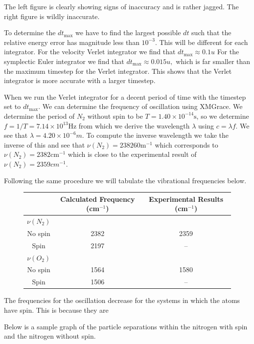 \documentclass[12pt]{article}
\begin{document}
	The left figure is clearly showing signs of inaccuracy and is rather jagged. The right figure is wildly inaccurate.
	
	To determine the $dt_{\text{max}}$ we have to find the largest possible $dt$ such that the relative energy error has magnitude less than $10^{-3}$. This will be different for each integrator. For the velocity Verlet integrator we find that $dt_{\text{max}} \approx 0.1u $ For the symplectic Euler integrator we find that $dt_{\text{max}} \approx 0.015u,$ which is far smaller than the maximum timestep for the Verlet integrator. This shows that the Verlet integrator is more accurate with a larger timestep. 
	
When we run the Verlet integrator for a decent period of time with the timestep set to $dt_{\text{max}}$. We can determine the frequency of oscillation using XMGrace. We determine the period of $N_2$ without spin to be $T = 1.40\times 10^{-14}\text{s}$, so we determine $f = 1/T = 7.14\times 10^{13}\text{Hz}$ from which we derive the wavelength $\lambda$ using $c=\lambda f$. We see that $\lambda = 4.20\times10^{-6}m.$ To compute the inverse wavelength we take the inverse of this and see that $\nu(N_2) = 238260\text{m}^{-1}$ which corresponds to $\nu(N_2) = 2382\text{cm}^{-1}$ which is close to the experimental result of $\nu(N_2)= 2359cm^{-1}.$

Following the same procedure we will tabulate the vibrational frequencies below.

\begin{figure}[H]
\centering
\begin{tabular}{c|cc}
& Calculated Frequency (cm$^{-1}$) & Experimental Results (cm$^{-1}$)\\
\hline
$\nu(N_2)$ & & \\
No spin & 2382 & 2359\\
Spin & 2197 & --\\
\hline
$\nu(O_2)$ & & \\
No spin & 1564 & 1580 \\
Spin & 1506 & --\\
\end{tabular}
\end{figure}

The frequencies for the oscillation decrease for the systems in which the atoms have spin. This is because they are 

Below is a sample graph of the particle separations within the nitrogen with spin and the nitrogen without spin. 
\end{document}
